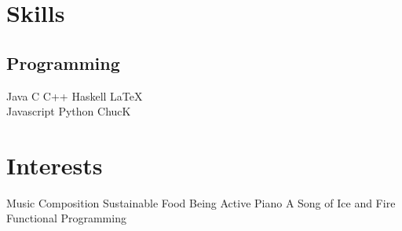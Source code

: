\documentclass[letterpaper]{deedy-resume} %
\begin{document}
\begin{minipage}[t]{0.33\textwidth}
\sectionspace %


\section{Skills}

\subsection{Programming}
Java \textbullet{} C \textbullet{} C++ \textbullet{} Haskell \textbullet{} \LaTeX  \\
Javascript \textbullet{} Python \textbullet{} ChucK \\




\sectionspace %

\section{Interests}
Music Composition \textbullet{} Sustainable Food \textbullet{}
Being Active \textbullet{} Piano \textbullet{}
A Song of Ice and Fire \textbullet{} Functional Programming


\end{minipage} %
\end{document}
